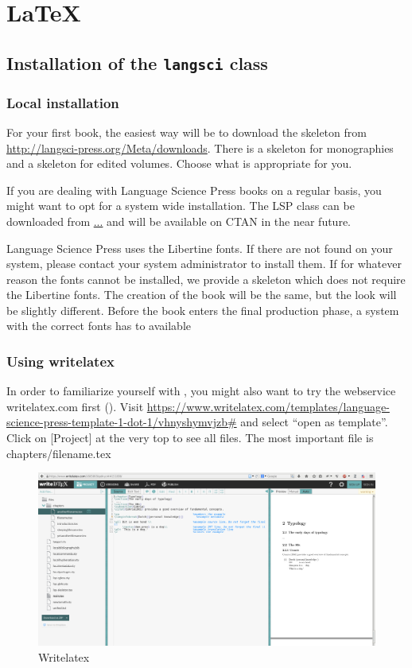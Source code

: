 \chapter{\LaTeX}

\section{Installation of the \texttt{langsci} class}
\subsection{Local installation}
For your first book, the easiest way will be to download the skeleton from \url{http://langsci-press.org/Meta/downloads}.
There is a skeleton for monographies and a skeleton for edited volumes. Choose what is appropriate for you.


If you are dealing with Language Science Press books on a regular basis, you might want to opt for a system wide installation. The LSP class can be downloaded from \url{...} and will be available on CTAN in the near future.

Language Science Press uses the Libertine fonts. If there are not found on your system, please contact your system administrator to install them. If for whatever reason the fonts cannot be installed, we provide a skeleton which does not require the Libertine fonts. The creation of the book will be the same, but the look will be slightly different. Before the book enters the final production phase, a system with the correct fonts has to available 

\subsection{Using writelatex}
In order to familiarize yourself with \latex, you might also want to try the webservice writelatex.com first (). Visit \url{https://www.writelatex.com/templates/language-science-press-template-1-dot-1/vhnyshymvjzb#} and select ``open as template''. Click on [Project] at the very top to see all files. The most important file is chapters/filename.tex

\begin{figure}
 \includegraphics[width=\textwidth]{writelatex.png}
  \caption{Writelatex}
  \label{fig:latex:writelatex}
\end{figure}

